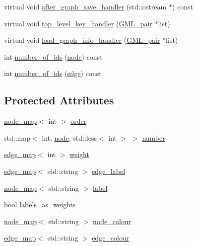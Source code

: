 \begin{DoxyCompactItemize}
virtual void \mbox{\hyperlink{classgraph_af0c7aba21d57d827ae96cae632441651}{after\+\_\+graph\+\_\+save\+\_\+handler}} (std\+::ostream $\ast$) const
\item 
virtual void \mbox{\hyperlink{classgraph_a33bc9b45f0d4738c491535147b703cc5}{top\+\_\+level\+\_\+key\+\_\+handler}} (\mbox{\hyperlink{struct_g_m_l__pair}{G\+M\+L\+\_\+pair}} $\ast$list)
\item 
virtual void \mbox{\hyperlink{classgraph_aaca9ede8005388fd22b56e12280bf1bf}{load\+\_\+graph\+\_\+info\+\_\+handler}} (\mbox{\hyperlink{struct_g_m_l__pair}{G\+M\+L\+\_\+pair}} $\ast$list)
\item 
int \mbox{\hyperlink{classgraph_a82f09714f50dbe41e1a9cbcb12ad0866}{number\+\_\+of\+\_\+ids}} (\mbox{\hyperlink{classnode}{node}}) const
\item 
int \mbox{\hyperlink{classgraph_a8db97e43b31c95ac6b0bd1820aa5224b}{number\+\_\+of\+\_\+ids}} (\mbox{\hyperlink{classedge}{edge}}) const
\end{DoxyCompactItemize}
\subsection*{Protected Attributes}
\begin{DoxyCompactItemize}
\item 
\mbox{\hyperlink{classnode__map}{node\+\_\+map}}$<$ int $>$ \mbox{\hyperlink{class_my_tree_afbd5fcfe2a1033b7b440bb2fcf55bb21}{order}}
\item 
std\+::map$<$ int, \mbox{\hyperlink{classnode}{node}}, std\+::less$<$ int $>$ $>$ \mbox{\hyperlink{class_my_tree_a307b02f445704719cfbc4229690e20d7}{number}}
\item 
\mbox{\hyperlink{classedge__map}{edge\+\_\+map}}$<$ int $>$ \mbox{\hyperlink{class_my_graph_aa6e12f16153220780e9db1eb30112b34}{weight}}
\item 
\mbox{\hyperlink{classedge__map}{edge\+\_\+map}}$<$ std\+::string $>$ \mbox{\hyperlink{class_my_graph_ac87b3f22352ddc7ec3864173a0d69cdd}{edge\+\_\+label}}
\item 
\mbox{\hyperlink{classnode__map}{node\+\_\+map}}$<$ std\+::string $>$ \mbox{\hyperlink{class_my_graph_a5c9923e2b43cb5a3139715acc34b8ca8}{label}}
\item 
bool \mbox{\hyperlink{class_my_graph_a1c451264db5a154029533d9368b90317}{labels\+\_\+as\+\_\+weights}}
\item 
\mbox{\hyperlink{classnode__map}{node\+\_\+map}}$<$ std\+::string $>$ \mbox{\hyperlink{class_my_graph_aa42370fd94b5789077f0ad70b76e4285}{node\+\_\+colour}}
\item 
\mbox{\hyperlink{classedge__map}{edge\+\_\+map}}$<$ std\+::string $>$ \mbox{\hyperlink{class_my_graph_aa10654166ca504696731c7f8011a5680}{edge\+\_\+colour}}
\end{DoxyCompactItemize}


